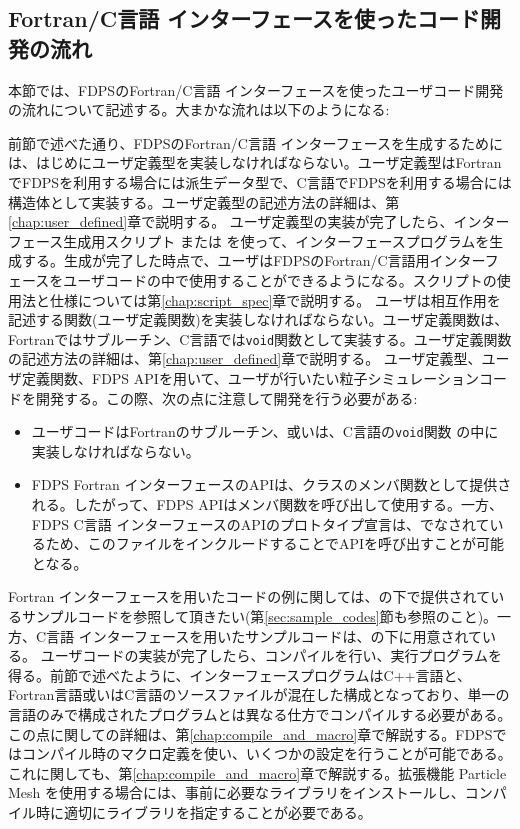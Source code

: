 \subsection{Fortran/C言語 インターフェースを使ったコード開発の流れ}
本節では、FDPSのFortran/C言語 インターフェースを使ったユーザコード開発の流れについて記述する。大まかな流れは以下のようになる:
\begin{enumerate}[leftmargin=*,label={[\arabic*]}]
 前節で述べた通り、FDPSのFortran/C言語 インターフェースを生成するためには、はじめにユーザ定義型を実装しなければならない。ユーザ定義型はFortranでFDPSを利用する場合には派生データ型で、C言語でFDPSを利用する場合には構造体として実装する。ユーザ定義型の記述方法の詳細は、第\ref{chap:user_defined}章で説明する。
 ユーザ定義型の実装が完了したら、インターフェース生成用スクリプト  または  を使って、インターフェースプログラムを生成する。生成が完了した時点で、ユーザはFDPSのFortran/C言語用インターフェースをユーザコードの中で使用することができるようになる。スクリプトの使用法と仕様については第\ref{chap:script_spec}章で説明する。
 ユーザは相互作用を記述する関数(ユーザ定義関数)を実装しなければならない。ユーザ定義関数は、Fortranではサブルーチン、C言語では\texttt{void}関数として実装する。ユーザ定義関数の記述方法の詳細は、第\ref{chap:user_defined}章で説明する。
 ユーザ定義型、ユーザ定義関数、FDPS APIを用いて、ユーザが行いたい粒子シミュレーションコードを開発する。この際、次の点に注意して開発を行う必要がある:
\begin{itemize}
\item ユーザコードはFortranのサブルーチン、或いは、C言語の\texttt{void}関数 の中に実装しなければならない。
\item FDPS Fortran インターフェースのAPIは、クラスのメンバ関数として提供される。したがって、FDPS APIはメンバ関数を呼び出して使用する。一方、FDPS C言語 インターフェースのAPIのプロトタイプ宣言は、でなされているため、このファイルをインクルードすることでAPIを呼び出すことが可能となる。
\end{itemize}
Fortran インターフェースを用いたコードの例に関しては、の下で提供されているサンプルコードを参照して頂きたい(第\ref{sec:sample_codes}節も参照のこと)。一方、C言語 インターフェースを用いたサンプルコードは、の下に用意されている。
 ユーザコードの実装が完了したら、コンパイルを行い、実行プログラムを得る。前節で述べたように、インターフェースプログラムはC++言語と、Fortran言語或いはC言語のソースファイルが混在した構成となっており、単一の言語のみで構成されたプログラムとは異なる仕方でコンパイルする必要がある。この点に関しての詳細は、第\ref{chap:compile_and_macro}章で解説する。FDPSではコンパイル時のマクロ定義を使い、いくつかの設定を行うことが可能である。これに関しても、第\ref{chap:compile_and_macro}章で解説する。拡張機能 Particle Mesh を使用する場合には、事前に必要なライブラリをインストールし、コンパイル時に適切にライブラリを指定することが必要である。

\end{enumerate}
